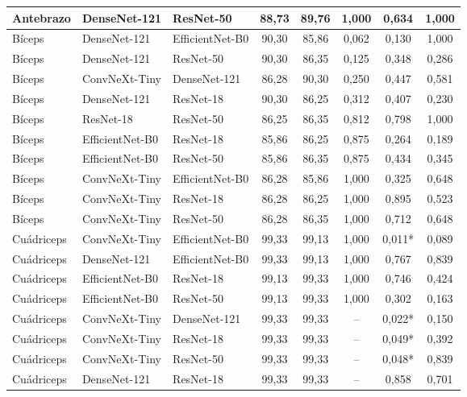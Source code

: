 \documentclass[12pt]{extarticle}
\numberwithin{equation}{section}
\begin{document}
\begin{table}[H]
\begin{tabular}{lllccccc}
Antebrazo & DenseNet-121    & ResNet-50       & 88{,}73 & 89{,}76 & 1{,}000 & 0{,}634 & 1{,}000 \\
\midrule
Bíceps    & DenseNet-121    & EfficientNet-B0 & 90{,}30 & 85{,}86 & 0{,}062 & 0{,}130 & 1{,}000 \\
Bíceps    & DenseNet-121    & ResNet-50       & 90{,}30 & 86{,}35 & 0{,}125 & 0{,}348 & 0{,}286 \\
Bíceps    & ConvNeXt-Tiny   & DenseNet-121    & 86{,}28 & 90{,}30 & 0{,}250 & 0{,}447 & 0{,}581 \\
Bíceps    & DenseNet-121    & ResNet-18       & 90{,}30 & 86{,}25 & 0{,}312 & 0{,}407 & 0{,}230 \\
Bíceps    & ResNet-18       & ResNet-50       & 86{,}25 & 86{,}35 & 0{,}812 & 0{,}798 & 1{,}000 \\
Bíceps    & EfficientNet-B0 & ResNet-18       & 85{,}86 & 86{,}25 & 0{,}875 & 0{,}264 & 0{,}189 \\
Bíceps    & EfficientNet-B0 & ResNet-50       & 85{,}86 & 86{,}35 & 0{,}875 & 0{,}434 & 0{,}345 \\
Bíceps    & ConvNeXt-Tiny   & EfficientNet-B0 & 86{,}28 & 85{,}86 & 1{,}000 & 0{,}325 & 0{,}648 \\
Bíceps    & ConvNeXt-Tiny   & ResNet-18       & 86{,}28 & 86{,}25 & 1{,}000 & 0{,}895 & 0{,}523 \\
Bíceps    & ConvNeXt-Tiny   & ResNet-50       & 86{,}28 & 86{,}35 & 1{,}000 & 0{,}712 & 0{,}648 \\
\midrule
Cuádriceps & ConvNeXt-Tiny   & EfficientNet-B0 & 99{,}33 & 99{,}13 & 1{,}000 & 0{,}011{*} & 0{,}089 \\
Cuádriceps & DenseNet-121    & EfficientNet-B0 & 99{,}33 & 99{,}13 & 1{,}000 & 0{,}767 & 0{,}839 \\
Cuádriceps & EfficientNet-B0 & ResNet-18       & 99{,}13 & 99{,}33 & 1{,}000 & 0{,}746 & 0{,}424 \\
Cuádriceps & EfficientNet-B0 & ResNet-50       & 99{,}13 & 99{,}33 & 1{,}000 & 0{,}302 & 0{,}163 \\
Cuádriceps & ConvNeXt-Tiny   & DenseNet-121    & 99{,}33 & 99{,}33 & --      & 0{,}022{*} & 0{,}150 \\
Cuádriceps & ConvNeXt-Tiny   & ResNet-18       & 99{,}33 & 99{,}33 & --      & 0{,}049{*} & 0{,}392 \\
Cuádriceps & ConvNeXt-Tiny   & ResNet-50       & 99{,}33 & 99{,}33 & --      & 0{,}048{*} & 0{,}839 \\
Cuádriceps & DenseNet-121    & ResNet-18       & 99{,}33 & 99{,}33 & --      & 0{,}858 & 0{,}701 \\

\end{tabular}
\end{table}
\end{document}

